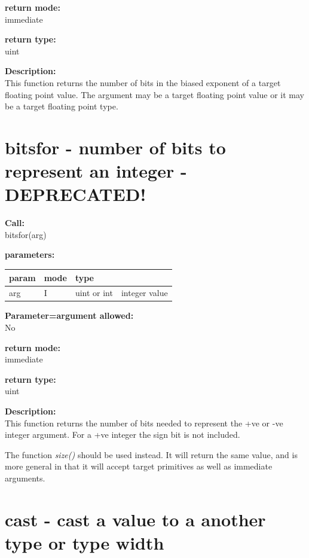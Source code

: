         {\bf return mode:} \\
        immediate

        {\bf return type:} \\
        uint
        
        {\bf Description:} \\
        This function returns the number of bits in the biased exponent of
        a target floating point value. The argument may be a target floating
        point value or it may be a target floating point type.


    \section{bitsfor - number of bits to represent an integer - DEPRECATED!}\label{sec:ifbitsfor}
        
        {\bf Call:} \\
        bitsfor(arg)
        
        {\bf parameters:} \\
        \begin{tabular}{| l | l | l | l |}
        \hline
        param  & mode & type & \\
        \hline \hline
        arg  & I & uint or int & integer value  \\ \hline
        \end{tabular}
        
        {\bf Parameter=argument allowed:} \\
        No
        
        {\bf return mode:} \\
        immediate

        {\bf return type:} \\
        uint
        
        {\bf Description:} \\
        This function returns the number of bits needed to represent the +ve or -ve
        integer argument. For a +ve integer the sign bit is not included.
        
        The function {\em size()}  should be used instead. It
        will return the same value, and is more general in that it will accept
        target primitives as well as immediate arguments.


    \section{cast - cast a value to a another type or type width}\label{sec:ifcast}
        
